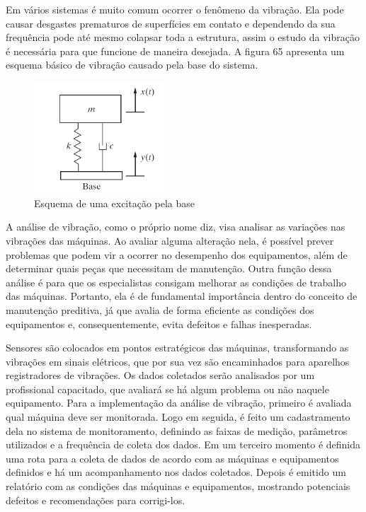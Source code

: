 Em vários sistemas é muito comum ocorrer o fenômeno da vibração. Ela pode causar desgastes prematuros de superfícies em contato e dependendo da sua frequência pode até mesmo colapsar toda a estrutura, assim o estudo da vibração é necessária para que funcione de maneira desejada. A figura 65 apresenta um esquema básico de vibração causado pela base do sistema.

\begin{figure}[H]
	\centering
	\includegraphics[width=5cm]{figuras/esquema_excitacao.png}
	\caption{Esquema de uma excitação pela base} \label{esquema_excitacao}
\end{figure}

A análise de vibração, como o próprio nome diz, visa analisar as variações nas vibrações das máquinas. Ao avaliar alguma alteração nela, é possível prever problemas que podem vir a ocorrer no desempenho dos equipamentos, além de determinar quais peças que necessitam de manutenção. Outra função dessa análise é para que os especialistas consigam melhorar as condições de trabalho das máquinas. Portanto, ela é de fundamental importância dentro do conceito de manutenção preditiva, já que avalia de forma eficiente as condições dos equipamentos e, consequentemente, evita defeitos e falhas inesperadas. \cite{nobrega2014}

Sensores são colocados em pontos estratégicos das máquinas, transformando as vibrações em sinais elétricos, que por sua vez são encaminhados para aparelhos registradores de vibrações. Os dados coletados serão analisados por um profissional capacitado, que avaliará se há algum problema ou não naquele equipamento. Para a implementação da análise de vibração, primeiro é avaliada qual máquina deve ser monitorada. Logo em seguida, é feito um cadastramento dela no sistema de monitoramento, definindo as faixas de medição, parâmetros utilizados e a frequência de coleta dos dados. Em um terceiro momento é definida uma rota para a coleta de dados de acordo com as máquinas e equipamentos definidos e há um acompanhamento nos dados coletados. Depois é emitido um relatório com as condições das máquinas e equipamentos, mostrando potenciais defeitos e recomendações para corrigi-los. \cite{nobrega2014}

